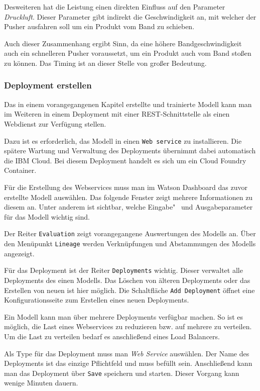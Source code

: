 Desweiteren hat die Leistung einen direkten Einfluss auf den Parameter \textit{Druckluft}. Dieser Parameter gibt
indirekt die Geschwindigkeit an, mit welcher der Pusher ausfahren soll um ein Produkt vom Band zu schieben.

Auch dieser Zusammenhang ergibt Sinn, da eine höhere Bandgeschwindigkeit auch ein schnelleren Pusher voraussetzt, um ein
Produkt auch vom Band stoßen zu können. Das Timing ist an dieser Stelle von großer Bedeutung.

\subsubsection{Deployment erstellen}
\label{subsec:deployment_erstellen}
Das in einem vorangegangenen Kapitel erstellte und trainierte Modell kann man im Weiteren in einem Deployment mit einer
REST-Schnittstelle als einen Webdienst zur Verfügung stellen.

Dazu ist es erforderlich, das Modell in einen \texttt{Web service} zu installieren. Die spätere Wartung und Verwaltung
des Deployments übernimmt dabei automatisch die IBM Cloud. Bei diesem Deployment handelt es sich um ein Cloud Foundry
Container.

Für die Erstellung des Webservices muss man im Watson Dashboard das zuvor erstellte Modell auswählen. Das folgende
Fenster zeigt mehrere Informationen zu diesem an. Unter anderem ist sichtbar, welche Eingabe"~ und Ausgabeparameter für
das Modell wichtig sind.

Der Reiter \texttt{Evaluation} zeigt vorangegangene Auswertungen des Modells an. Über den Menüpunkt \texttt{Lineage}
werden Verknüpfungen und Abstammungen des Modells angezeigt.

Für das Deployment ist der Reiter \texttt{Deployments} wichtig. Dieser verwaltet alle Deployments des einen Modells. Das
Löschen von älteren Deployments oder das Erstellen von neuen ist hier möglich. Die Schaltfläche \texttt{Add Deployment}
öffnet eine Konfigurationsseite zum Erstellen eines neuen Deployments.

Ein Modell kann man über mehrere Deployments verfügbar machen. So ist es möglich, die Last eines Webservices zu
reduzieren bzw. auf mehrere zu verteilen. Um die Last zu verteilen bedarf es anschließend eines Load Balancers.

Als Type für das Deployment muss man \textit{Web Service} auswählen. Der Name des Deployments ist das einzige
Pflichtfeld und muss befüllt sein. Anschließend kann man das Deployment über \texttt{Save} speichern und starten. Dieser
Vorgang kann wenige Minuten dauern.

